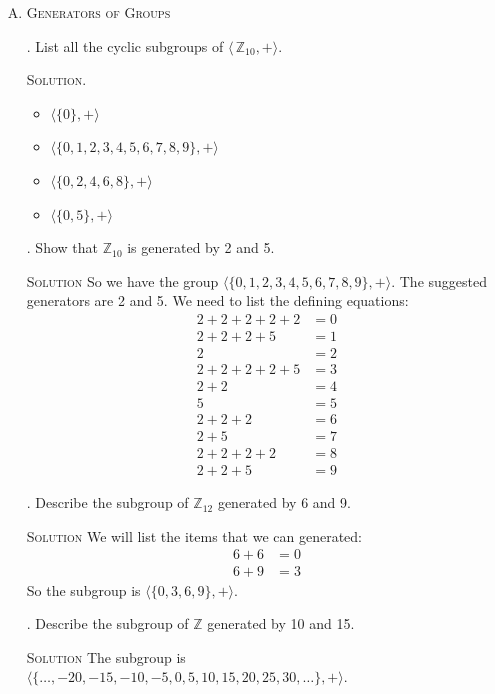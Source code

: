 \documentclass[twoside]{amsart}
\newcommand{\solution}{\textsc{Solution}\xspace}
\begin{document}
\begin{enumerate}[A.]
    \item \textsc{Generators of Groups}

    . List all the cyclic subgroups of $\langle\,
    \mathbb{Z}_{10}, + \rangle$.

    \noindent \solution. 
    \begin{itemize}
        \item $\langle \{0\}, +\rangle$
	\item $\langle \{0,1,2,3,4,5,6,7,8,9\}, +\rangle$
	\item $\langle \{0,2,4,6,8\}, +\rangle$
	\item $\langle \{0,5\}, +\rangle$
    \end{itemize}

    . Show that $\mathbb{Z}_{10}$ is generated by 2 and 5.

    \noindent \solution So we have the group $\langle \{0,1,2,3,4,5,
    6,7,8,9\}, +\rangle$. The suggested generators are 2 and 5. We need
    to list the defining equations:
    \begin{align*}
       2 + 2 + 2 + 2 + 2 &= 0 \\
           2 + 2 + 2 + 5 &= 1 \\
                       2 &= 2 \\
       2 + 2 + 2 + 2 + 5 &= 3 \\
                   2 + 2 &= 4 \\
                       5 &= 5 \\
               2 + 2 + 2 &= 6 \\
                   2 + 5 &= 7 \\
           2 + 2 + 2 + 2 &= 8 \\
               2 + 2 + 5 &= 9 
    \end{align*}

    . Describe the subgroup of $\mathbb{Z}_{12}$ generated by
    6 and 9.

    \noindent \solution We will list the items that we can generated:
    \begin{align*}
       6 + 6 &= 0 \\
       6 + 9 &= 3
    \end{align*}
    So the subgroup is $\langle \{0,3,6,9\}, + \rangle$.

    . Describe the subgroup of $\mathbb{Z}$ generated by 10 and 15.
    
    \noindent \solution The subgroup is $\langle \{\dots,-20,-15,-10,-5,0,5,
    10,15,20,25,30,\dots\}, + \rangle$. 


\end{enumerate}
\end{document}
